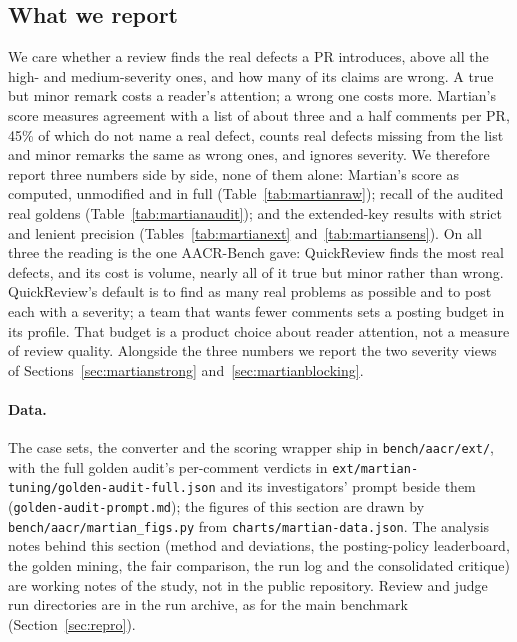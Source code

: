 \documentclass[11pt,a4paper]{article}
\newcommand{\qcr}{QuickReview}
\newcommand{\code}[1]{\texttt{#1}}
\begin{document}
\subsection{What we report}
\label{sec:martianpos}

We care whether a review finds the real defects a PR introduces, above all
the high- and medium-severity ones, and how many of its claims are wrong.
A true but minor remark costs a reader's attention; a wrong one costs more.
Martian's score measures agreement with a list of about three and a half
comments per PR, 45\% of which do not name a real defect, counts real defects
missing from the list and minor remarks the same as wrong ones, and ignores
severity. We therefore report three numbers side by side, none of them
alone: Martian's score as computed, unmodified and in full
(Table~\ref{tab:martianraw}); recall of the audited real goldens
(Table~\ref{tab:martianaudit}); and the extended-key results with strict and
lenient precision (Tables~\ref{tab:martianext} and~\ref{tab:martiansens}).
On all three the reading is the one AACR-Bench gave: \qcr{} finds the most
real defects, and its cost is volume, nearly all of it true but minor rather
than wrong. \qcr{}'s default is to find as many real problems as possible
and to post each with a severity; a team that wants fewer comments sets a
posting budget in its profile. That budget is a product choice about
reader attention, not a measure of review quality. Alongside the three
numbers we report the two severity views of
Sections~\ref{sec:martianstrong} and~\ref{sec:martianblocking}.

\paragraph{Data.} The case sets, the converter and the scoring wrapper
ship in \code{bench/aacr/ext/}, with the full golden audit's per-comment
verdicts in \code{ext/martian-tuning/golden-audit-full.json} and its
investigators' prompt beside them (\code{golden-audit-prompt.md}); the figures of
this section are drawn by \code{bench/aacr/martian\_figs.py} from
\code{charts/martian-data.json}. The analysis notes behind this section
(method and deviations, the posting-policy leaderboard, the golden mining, the
fair comparison, the run log and the consolidated critique) are working notes
of the study, not in the public repository. Review and judge run directories
are in the run archive, as for the main benchmark
(Section~\ref{sec:repro}).

\end{document}
